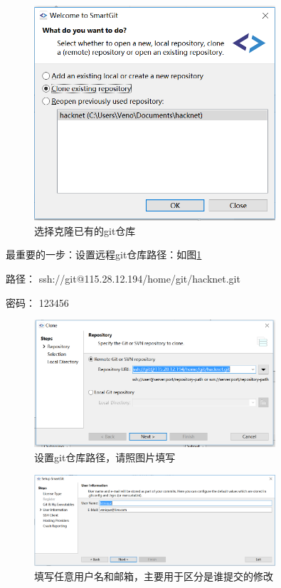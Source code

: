 \documentclass[10pt,a4paper,UTF8]{article}
\begin{document}
        \begin{figure}[H]
            \centering
            \includegraphics[width=0.8\textwidth]{clone-confirm.PNG}
            \caption{选择克隆已有的git仓库}
        \end{figure}

        最重要的一步：设置远程git仓库路径：如图\ref{fig:setting}

        路径： ssh://git@115.28.12.194/home/git/hacknet.git

        密码： 123456

        \begin{figure}[H]
            \centering
            \includegraphics[width=0.8\textwidth]{setting.PNG}
            \caption{设置git仓库路径，请照图片填写}
            \label{fig:setting}
        \end{figure}        

        \begin{figure}[H]
            \centering
            \includegraphics[width=0.8\textwidth]{user-name.PNG}
            \caption{填写任意用户名和邮箱，主要用于区分是谁提交的修改}
        \end{figure}        
\end{document}
